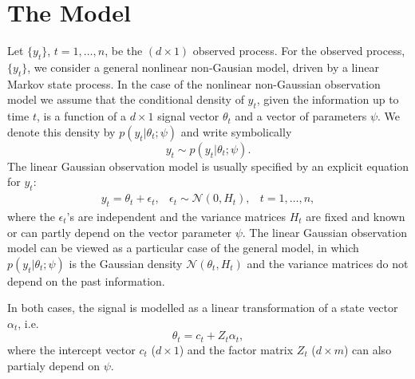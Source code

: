 \documentclass{article}
\begin{document}
\section{The Model}
\label{sec:modelDef}


Let $\{y_{t}\}$, $t=1,\dots,n$, be the $(d\times1)$ observed process.
For the observed process, $\{y_{t}\}$, we consider a general nonlinear non-Gausian model,
driven by a linear Markov state process.
In the case of the nonlinear non-Gaussian observation model we assume that the conditional
density of $y_{t}$, given the information up to time $t$, is a function of a $d \times 1$
signal vector $\theta_{t}$ and a vector of parameters $\psi$. We denote this density by
$p(y_{t}|\theta_{t};\psi)$ and write symbolically
\begin{equation}
  \label{eq:measurementH}
  y_{t} \sim p(y_{t}|\theta_{t};\psi)
  .
\end{equation}
The linear Gaussian observation model is usually specified by an
explicit equation for $y_{t}$:
\begin{equation}
  \begin{array}{rcl}
    y_{t}  = \theta_t + \epsilon_t,
    & \epsilon_t \sim \mathcal{N}(0,H_t),
    & t=1,\dots,n
    ,
  \end{array}
  \label{eq:measurement}
\end{equation}
where the $\epsilon_t$'s are independent and the variance matrices $H_t$ are fixed and known
or can partly depend on the vector parameter $\psi$.  The linear Gaussian observation model
can be viewed as a particular case of the general model, in which $p(y_{t}|\theta_{t};\psi)$
is the Gaussian density $\mathcal{N}(\theta_{t}, H_{t})$ and the variance matrices do not
depend on the past information.

In both cases, the signal is modelled as a linear transformation of a state vector
$\alpha_t$, i.e.
\begin{equation*} \label{eq:thetat}
  \theta_t = c_t + Z_t \alpha_t
  ,
\end{equation*}
where the intercept vector $c_t$ ($d \times 1$) and the factor matrix $Z_t$ ($d \times m$)
can also partialy depend on $\psi$.
\end{document}
